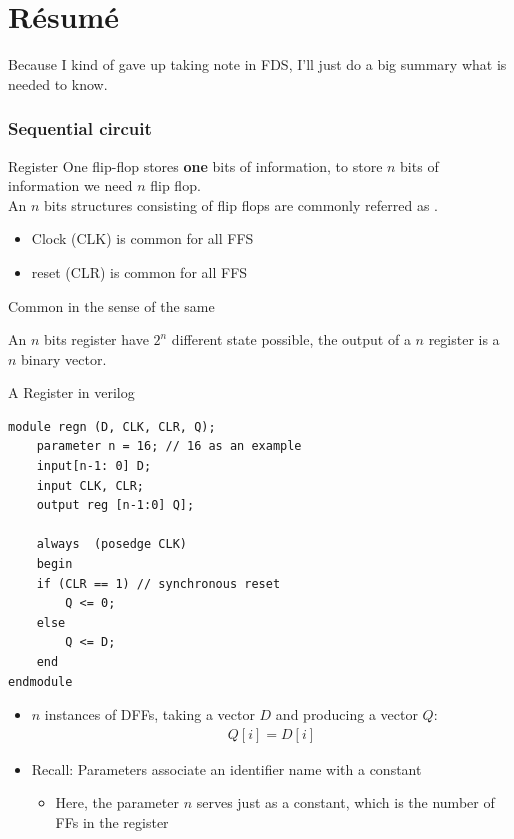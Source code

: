 \section{Résumé}
Because I kind of gave up taking note in FDS, I'll just do a big summary what is needed to know.

\subsubsection{Sequential circuit}

\begin{parag}{Register}
    One flip-flop stores \textbf{one} bits of information, to store $n$ bits of information we need $n$ flip flop.\\
    An $n$ bits structures consisting of flip flops are commonly referred as .\\
    \begin{itemize}
        \item Clock (CLK) is common for all FFS
        \item reset (CLR) is common for all FFS
    \end{itemize}
    Common in the sense of the same
    \begin{framedremark}
    An  $n$ bits register have $2^n$ different state possible, the output of a $n$ register is a $n$ binary vector.
    \end{framedremark}
    
    \begin{subparag}{A Register in verilog}
        
    
    \begin{lstlisting}
module regn (D, CLK, CLR, Q);
    parameter n = 16; // 16 as an example
    input[n-1: 0] D;
    input CLK, CLR;
    output reg [n-1:0] Q];

    always  (posedge CLK)
    begin
    if (CLR == 1) // synchronous reset
        Q <= 0;
    else
        Q <= D;
    end
endmodule   
    \end{lstlisting}
    
    \begin{itemize}
        \item $n$ instances of DFFs, taking a vector $D$ and producing a vector $Q$:
            \begin{align*} Q\left[i\right] =  D\left[i\right] \end{align*}
            \item Recall: Parameters associate an identifier name with a constant
                \begin{itemize}
                    \item Here, the parameter $n$ serves just as a constant, which is the number of FFs in the register
                \end{itemize}
                
    \end{itemize}
    \end{subparag}
\end{parag}
